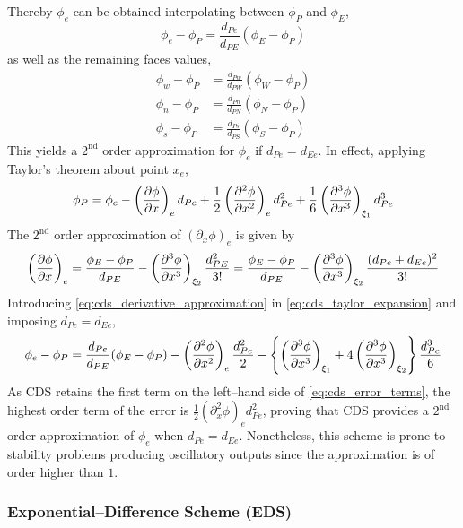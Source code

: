 \noindent
Thereby $\phi_e$ can be obtained interpolating between $\phi_P$ and $\phi_E$,
\begin{equation} \label{eq:cds_e}
	\phi_e - \phi_P = \frac{d_{Pe}}{d_{PE}} (\phi_E - \phi_P)
\end{equation}
as well as the remaining faces values,
\begin{align}
	\phi_w - \phi_P &= \frac{d_{Pw}}{d_{PW}} (\phi_W - \phi_P) \\
	\phi_n - \phi_P &= \frac{d_{Pn}}{d_{PN}} (\phi_N - \phi_P) \\
	\phi_s - \phi_P &= \frac{d_{Ps}}{d_{PS}} (\phi_S - \phi_P) \label{eq:cds_s}
\end{align}
This yields a $2^{\text{nd}}$ order approximation for $\phi_e$ if $d_{Pe} = d_{Ee}$. In effect, applying Taylor's theorem about point $x_e$,
\begin{equation} \label{eq:cds_taylor_expansion}
	\phi_P = 
	\phi_e 
	- \left(\pdv{\phi}{x}\right)_e d_{Pe} 
	+ \frac{1}{2} \left(\pdv[2]{\phi}{x}\right)_e d_{Pe}^2 
	+ \frac{1}{6} \left(\pdv[3]{\phi}{x}\right)_{\xi_1} d_{Pe}^3
\end{equation}
The $2^\text{nd}$ order approximation of $(\partial_x \phi)_e$ is given by
\begin{equation} \label{eq:cds_derivative_approximation}
	\left(\pdv{\phi}{x}\right)_e = 
	\frac{\phi_E - \phi_P}{d_{PE}} - \left(\pdv[3]{\phi}{x}\right)_{\xi_2} \frac{d_{PE}^2}{3!} = 	
	\frac{\phi_E - \phi_P}{d_{PE}} - \left(\pdv[3]{\phi}{x}\right)_{\xi_2} \frac{(d_{Pe} + d_{Ee})^2}{3!}
\end{equation}
Introducing \eqref{eq:cds_derivative_approximation} in \eqref{eq:cds_taylor_expansion} and imposing $d_{Pe} = d_{Ee}$, 
\begin{equation} \label{eq:cds_error_terms}
	\phi_e - \phi_P = 
	\frac{d_{Pe}}{d_{PE}} (\phi_E - \phi_P) - 
	\left( \pdv[2]{\phi}{x} \right)_e \frac{d_{Pe}^2}{2} -
	\left\{ 
	\left( \pdv[3]{\phi}{x} \right)_{\xi_1} + 4 \left( \pdv[3]{\phi}{x} \right)_{\xi_2}
	\right\} 
	\frac{d_{Pe}^3}{6}
\end{equation}
As CDS retains the first term on the left--hand side of \eqref{eq:cds_error_terms}, the highest order term of the error is $\frac{1}{2} (\partial_x^2 \phi)_e d_{Pe}^2$, proving that CDS provides a $2^\text{nd}$ order approximation of $\phi_e$ when $d_{Pe} = d_{Ee}$. Nonetheless, this scheme is prone to stability problems producing oscillatory outputs since the approximation is of order higher than $1$.

\subsubsection{Exponential--Difference Scheme (EDS)}

